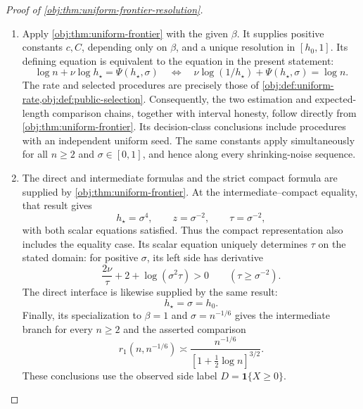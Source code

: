 \documentclass[11pt]{article}
\begin{document}
\begin{proof}[Proof of \cref{obj:thm:uniform-frontier-resolution}]
\begin{enumerate}
\item Apply \cref{obj:thm:uniform-frontier} with the given \(\beta\). It supplies positive constants \(c,C\), depending only on \(\beta\), and a unique resolution in \([h_0,1]\). Its defining equation is equivalent to the equation in the present statement:
\[
\log n+\nu\log h_\star=\Psi(h_\star,\sigma)
\quad\Longleftrightarrow\quad
\nu\log(1/h_\star)+\Psi(h_\star,\sigma)=\log n.
\]
The rate and selected procedures are precisely those of
\cref{obj:def:uniform-rate,obj:def:public-selection}. Consequently, the two estimation and expected-length comparison chains, together with interval honesty, follow directly from \cref{obj:thm:uniform-frontier}. Its decision-class conclusions include procedures with an independent uniform seed. The same constants apply simultaneously for all \(n\ge2\) and \(\sigma\in[0,1]\), and hence along every shrinking-noise sequence.

\item The direct and intermediate formulas and the strict compact formula are supplied by \cref{obj:thm:uniform-frontier}. At the intermediate--compact equality, that result gives
\[
h_\star=\sigma^4,\qquad z=\sigma^{-2},\qquad \tau=\sigma^{-2},
\]
with both scalar equations satisfied. Thus the compact representation also includes the equality case. Its scalar equation uniquely determines \(\tau\) on the stated domain: for positive \(\sigma\), its left side has derivative
\[
\frac{2\nu}{\tau}+2+\log(\sigma^2\tau)>0
\qquad(\tau\ge\sigma^{-2}).
\]
The direct interface is likewise supplied by the same result:
\[
h_\star=\sigma=h_0.
\]
Finally, its specialization to \(\beta=1\) and \(\sigma=n^{-1/6}\) gives the intermediate branch for every \(n\ge2\) and the asserted comparison
\[
r_1(n,n^{-1/6})
\asymp
\frac{n^{-1/6}}{[1+\tfrac12\log n]^{3/2}}.
\]
These conclusions use the observed side label \(D=\mathbf1\{X\ge0\}\).
\end{enumerate}
\end{proof}




\end{document}
